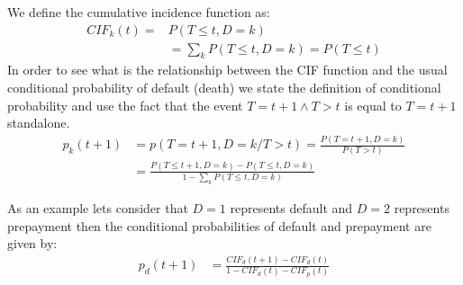 \documentclass[12pt]{book}
\begin{document}
We define the cumulative incidence function as:
\begin{align}
    CIF_k(t)=&P(T\leq t,D=k) \\
    &=\sum_k P(T \leq t,D=k) = P(T \leq t)
\end{align}
In order to see what is the relationship between the CIF function and the usual conditional probability of default (death) we state the definition of conditional probability and use the fact that the event $T=t+1 \wedge T>t$ is equal to $T=t+1$ standalone.
\begin{align}
    p_k(t+1)&=p(T=t+1,D=k/T>t)=\frac{P(T=t+1,D=k)}{P(T>t)}\\
    &= \frac{ P(T \leq t+1,D=k)-P(T\leq t,D=k)}{
    1-\sum_k P(T \leq t, D=k)
    }
\end{align}

As an example lets consider that $D=1$ represents default
and $D=2$ represents prepayment then the conditional probabilities of default and prepayment are given by:
\begin{align}
p_d(t+1)&= \frac{CIF_d(t+1)-CIF_d(t)  }{
1- CIF_d(t)-CIF_p(t)}  
\end{align}







 
\end{document}
